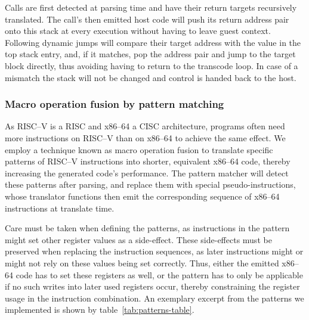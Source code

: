 Calls are first detected at parsing time and have their return targets recursively translated.
The call's then emitted host code will push its return address pair onto this stack at every execution without having to leave guest context.
Following dynamic jumps will compare their target address with the value in the top stack entry, and, if it matches, pop the address pair and jump to the target block directly, thus avoiding having to return to the transcode loop.
In case of a mismatch the stack will not be changed and control is handed back to the host.


\subsubsection{Macro operation fusion by pattern matching}
\label{sec:pattern-matching}
As RISC--V is a RISC and x86--64 a CISC architecture, programs often need more instructions on RISC--V than on x86--64 to achieve the same effect.
We employ a technique known as macro operation fusion to translate specific patterns of RISC--V instructions into shorter, equivalent x86--64 code, thereby increasing the generated code's performance.
The pattern matcher will detect these patterns after parsing, and replace them with special pseudo-instructions, whose translator functions then emit the corresponding sequence of x86--64 instructions at translate time.

Care must be taken when defining the patterns, as instructions in the pattern might set other register values as a side-effect.
These side-effects must be preserved when replacing the instruction sequences, as later instructions might or might not rely on these values being set correctly.
Thus, either the emitted x86--64 code has to set these registers as well, or the pattern has to only be applicable if no such writes into later used registers occur, thereby constraining the register usage in the instruction combination.
An exemplary excerpt from the patterns we implemented is shown by table~\ref{tab:patterns-table}.


